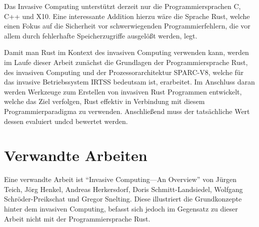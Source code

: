 Das Invasive Computing unterstützt derzeit nur die Programmiersprachen C, C++ und X10. Eine interessante Addition hierzu wäre
die Sprache Rust, welche einen Fokus auf die Sicherheit vor schwerwiegenden Programmierfehlern, die vor allem durch
fehlerhafte Speicherzugriffe ausgelößt werden, legt.

Damit man Rust im Kontext des invasiven Computing verwenden kann, werden im Laufe dieser Arbeit zunächst die Grundlagen der
Programmiersprache Rust, des invasiven Computing und der Prozessorarchitektur SPARC-V8, welche für das
invasive Betriebssystem IRTSS bedeutsam ist, erarbeitet. Im Anschluss daran werden Werkzeuge zum Erstellen von invasiven
Rust Programmen entwickelt, welche das Ziel verfolgen, Rust effektiv in Verbindung mit diesem Programmierparadigma zu verwenden.
Anschließend muss der tatsächliche Wert dessen evaluiert undcd bewertet werden.

\section{Verwandte Arbeiten}

Eine verwandte Arbeit ist "`Invasive Computing—An Overview"'\cite{teich11msoc} von Jürgen Teich, Jörg Henkel, Andreas Herkersdorf,
Doris Schmitt-Landsiedel, Wolfgang Schröder-Preikschat und Gregor Snelting.
Diese illustriert die Grundkonzepte hinter dem invasiven Computing, befasst sich jedoch im Gegensatz zu dieser Arbeit nicht mit der
Programmiersprache Rust.

